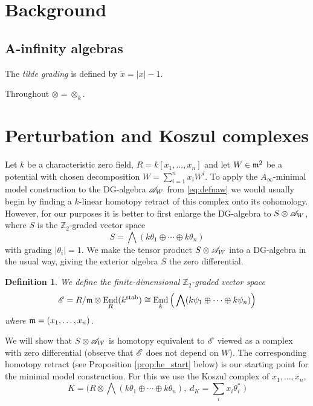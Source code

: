 \documentclass[english,letter paper,12pt,leqno]{article}
\theoremstyle{example}
\newtheorem{definition}[theorem]{Definition}
\numberwithin{equation}{section}
\def\stab{\operatorname{stab}}
\def\be{\begin{equation}}
\def\ee{\end{equation}}
\def\nZ{\mathds{Z}}
\DeclareMathOperator{\End}{End}
\begin{document}
\section{Background}

\subsection{A-infinity algebras}

The \emph{tilde grading} is defined by $\widetilde{x} = |x| - 1$.

Throughout $\otimes = \otimes_k$.

\section{Perturbation and Koszul complexes}

Let $k$ be a characteristic zero field, $R =  k[x_1,\ldots,x_n]$ and let $W \in \mathfrak{m}^2$ be a potential with chosen decomposition $W = \sum_{i=1}^n x_i W^i$. To apply the $A_\infty$-minimal model construction to the DG-algebra $\mathscr{A}_W$ from \eqref{eq:defnaw} we would usually begin by finding a $k$-linear homotopy retract of this complex onto its cohomology. However, for our purposes it is better to first enlarge the DG-algebra to $S \otimes \mathscr{A}_W$, where $S$ is the $\nZ_2$-graded vector space
\be
S = \bigwedge( k\theta_1 \oplus \cdots \oplus k \theta_n )
\ee
with grading $|\theta_i| = 1$. We make the tensor product $S \otimes \mathscr{A}_W$ into a DG-algebra in the usual way, giving the exterior algebra $S$ the zero differential.

\begin{definition} We define the finite-dimensional $\nZ_2$-graded vector space
\be\label{eq:defnunderlineend}
\md{E} = R/\mf{m} \otimes \End_R(k^{\stab}) \cong \End_k\Big( \bigwedge( k\psi_1 \oplus \cdots \oplus k \psi_n) \Big)
\ee
where $\mathfrak{m} = (x_1,\ldots,x_n)$.
\end{definition}

We will show that $S \otimes \mathscr{A}_W$ is homotopy equivalent to $\mathscr{E}$ viewed as a complex with zero differential (observe that $\mathscr{E}$ does not depend on $W$). The corresponding homotopy retract (see Proposition \ref{prop:he_start} below) is our starting point for the minimal model construction. For this we use the Koszul complex of $x_1,\ldots,x_n$,
\be\label{eq:defnkoszulK}
K = \Big( R \otimes \bigwedge( k\theta_1 \oplus \cdots \oplus k \theta_n ), \; d_K = \sum_i x_i \theta_i^*\; \Big)
\ee
\end{document}
